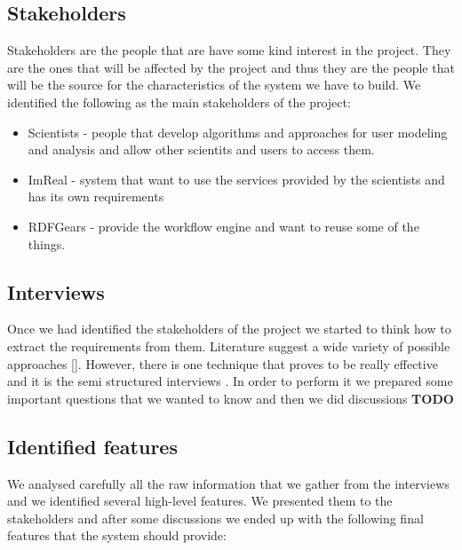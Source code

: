 \subsection{Stakeholders}

Stakeholders are the people that are have some kind interest in the project. They are the ones that will be affected by the project and thus they are the people that will be the source for the characteristics of the system we have to build. We identified the following as the main stakeholders of the project:  

\begin{itemize}
\item Scientists - people that develop algorithms and approaches for user modeling and analysis and allow other scientits and users to access them.
\item ImReal - system that want to use the services provided by the scientists and has its own requirements
\item RDFGears - provide the workflow engine and want to reuse some of the things.
\end{itemize}

\subsection{Interviews}

Once we had identified the stakeholders of the project we started to think how to extract the requirements from them. Literature suggest a wide variety of possible approaches []. However, there is one technique that proves to be really effective and it is the semi structured interviews \cite{Dieste}. In order to perform it we prepared some important questions that we wanted to know and then we did discussions \textbf{TODO}

\subsection{Identified features}

We analysed carefully all the raw information that we gather from the interviews and we identified several high-level features. We presented them to the stakeholders and after some discussions we ended up with the following final features that the system should provide: 

